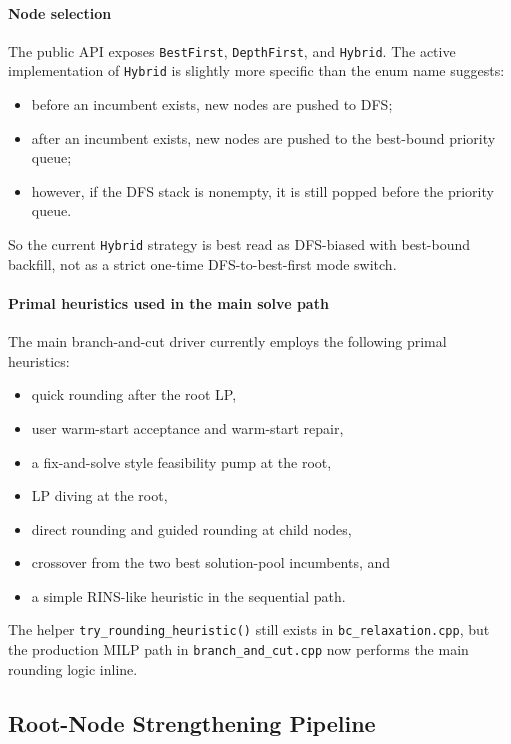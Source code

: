 \paragraph{Node selection}
The public API exposes \texttt{BestFirst}, \texttt{DepthFirst}, and \texttt{Hybrid}. The active implementation of \texttt{Hybrid} is slightly more specific than the enum name suggests:
\begin{itemize}
  \item before an incumbent exists, new nodes are pushed to DFS;
  \item after an incumbent exists, new nodes are pushed to the best-bound priority queue;
  \item however, if the DFS stack is nonempty, it is still popped before the priority queue.
\end{itemize}
So the current \texttt{Hybrid} strategy is best read as DFS-biased with best-bound backfill, not as a strict one-time DFS-to-best-first mode switch.

\paragraph{Primal heuristics used in the main solve path}
The main branch-and-cut driver currently employs the following primal heuristics:
\begin{itemize}
  \item quick rounding after the root LP,
  \item user warm-start acceptance and warm-start repair,
  \item a fix-and-solve style feasibility pump at the root,
  \item LP diving at the root,
  \item direct rounding and guided rounding at child nodes,
  \item crossover from the two best solution-pool incumbents, and
  \item a simple RINS-like heuristic in the sequential path.
\end{itemize}

The helper \texttt{try\_rounding\_heuristic()} still exists in \texttt{bc\_relaxation.cpp}, but the production MILP path in \texttt{branch\_and\_cut.cpp} now performs the main rounding logic inline.

\subsection{Root-Node Strengthening Pipeline}

